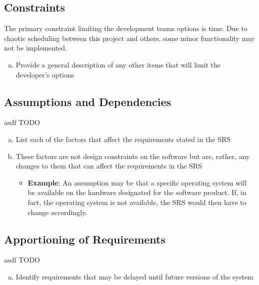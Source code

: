 \documentclass[]{article}
\begin{document}
\subsection{Constraints}%
\label{sub:constraints}
The primary constraint limiting the development teams options is time. Due to chaotic scheduling
between this project and others, some minor functionality may not be implemented.

\color{red}
\begin{enumerate}[a)]
	\item Provide a general description of any other items that will limit the developer's options
\end{enumerate}
\color{black}

\subsection{Assumptions and Dependencies}%
\label{sub:assumptions_and_dependencies}
asdf TODO


\color{red}
\begin{enumerate}[a)]
    \item List each of the factors that affect the requirements stated in the SRS
    \item These factors are not design constraints on the software but are, rather, any changes to
    them that can affect the requirements in the SRS
	\begin{itemize}
        \item \textbf{Example}: An assumption may be that a specific operating system will be
        available on the hardware designated for the software product. If, in fact, the operating
        system is not available, the SRS would then have to change accordingly.
	\end{itemize}
\end{enumerate}
\color{black}

\subsection{Apportioning of Requirements}%
\label{sub:apportioning_of_requirements}
asdf TODO


\color{red}
\begin{enumerate}[a)]
	\item Identify requirements that may be delayed until future versions of the system
\end{enumerate}
\color{black}
\end{document}

